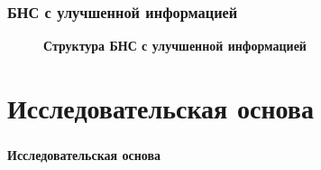 \documentclass[usenames,dvipsnames, 10pt]{beamer}
\begin{document}
\begin{frame}
\frametitle{БНС с улучшенной информацией}
\begin{figure}
    \caption*{\small\textbf{Структура БНС с улучшенной информацией}}
    \label{image:IE-Net}
\end{figure}
\end{frame}

\section{Исследовательская основа}
\begin{frame}
\frametitle{\phatom}
\centering
\Large \textbf{Исследовательская основа}
\end{frame}
\end{document}

